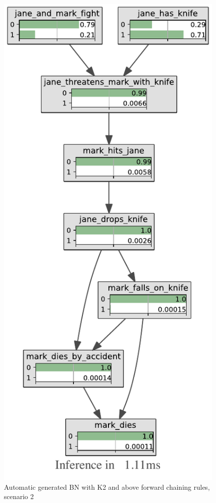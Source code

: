 \begin{figure}[htbp]
\centering
\includegraphics[scale=0.7]{images/Kb2.pdf}
\caption{Automatic generated BN with K2 and above forward chaining rules, scenario 2}
\label{kb2}

\end{figure}
